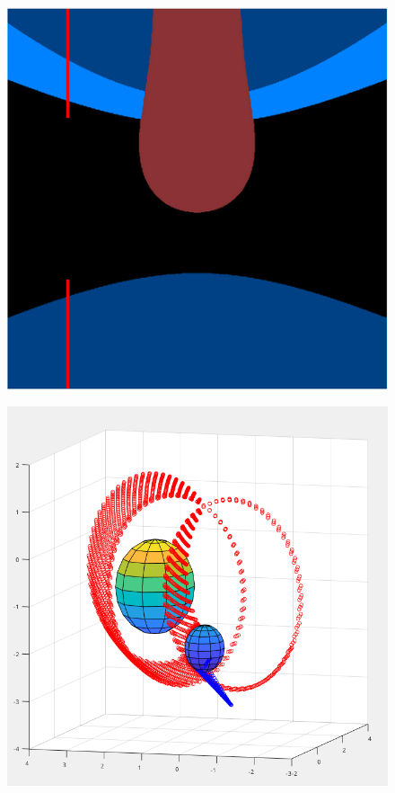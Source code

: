 \documentclass[titlepage]{article}
\begin{document}
\begin{figure}[H]
\centering
\begin{minipage}{.5\textwidth}
  \centering
  \includegraphics[width=1\linewidth]{Images/2sphere_render.png}
  \label{fig:2sphRend}
\end{minipage}%
\begin{minipage}{.5\textwidth}
  \centering
  \includegraphics[height=1\linewidth]{Images/2sphere_rays.png}
  \label{fig:2sphRays}
\end{minipage}
\end{figure}
\end{document}
